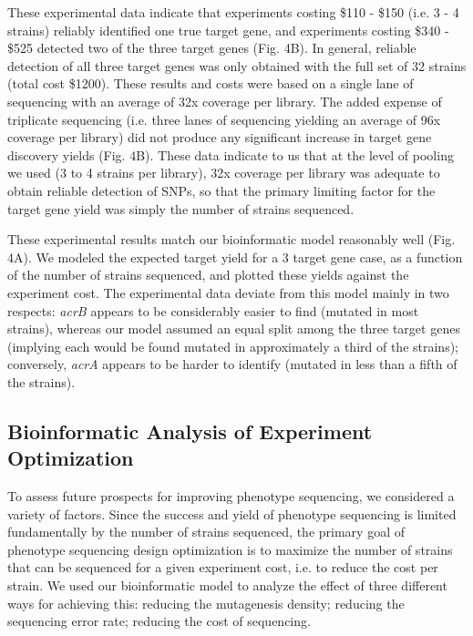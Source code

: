 \documentclass[letterpaper,10pt,english]{howto}
\begin{document}
These experimental data indicate that experiments costing
\$110 - \$150 (i.e. 3 - 4 strains) reliably identified one true target gene,
and experiments costing \$340 - \$525 detected two of the three target
genes (Fig. 4B).  In general, reliable detection of all three target genes
was only obtained with the full set of 32 strains (total cost \$1200).
These results and costs were based on a single lane of sequencing
with an average of 32x coverage per library.
The added expense of triplicate sequencing (i.e. three lanes of
sequencing yielding an average of 96x coverage per library) did not
produce any significant increase in target gene discovery yields (Fig. 4B).
These data indicate to us that at the level of pooling we
used (3 to 4 strains per library), 32x coverage per library was
adequate to obtain reliable detection of SNPs, so that the primary
limiting factor for the target gene yield was simply the number
of strains sequenced.

These experimental results match our
bioinformatic model reasonably well (Fig. 4A).  We modeled
the expected target yield for a 3 target gene case, as a function of
the number of strains sequenced, and plotted these yields against
the experiment cost.  The experimental data deviate from this model
mainly in two respects: \emph{acrB} appears to be considerably easier
to find (mutated in most strains), whereas our model assumed
an equal split among the three target genes (implying each would
be found mutated in approximately a third of the strains);
conversely, \emph{acrA} appears to be harder to identify (mutated in
less than a fifth of the strains).


\subsection{Bioinformatic Analysis of Experiment Optimization}

To assess future prospects for improving phenotype sequencing,
we considered a variety of factors.
Since the success and yield of phenotype sequencing
is limited fundamentally by the number of strains sequenced,
the primary goal of phenotype sequencing design optimization
is to maximize the number of strains that can be sequenced for
a given experiment cost, i.e. to reduce the cost per strain.
We used our bioinformatic model to analyze the effect of
three different ways for achieving this: reducing the mutagenesis
density; reducing the sequencing error rate; reducing the cost
of sequencing.
\end{document}
